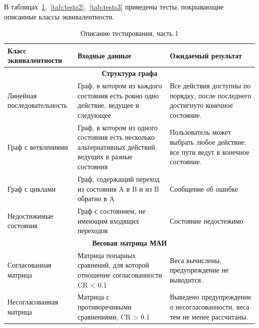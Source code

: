 В таблицах~\ref{tab:tests1},~\ref{tab:tests2},~\ref{tab:tests3} приведены тесты, покрывающие описанные классы эквивалентности.
\begin{table}[H]
\centering
\caption{Описание тестирования, часть 1}
\label{tab:tests1}
\begin{tabular}{|p{}|p{}|p{}|}
\hline
\textbf{Класс \newline эквивалентности} & \textbf{Входные данные} & \textbf{Ожидаемый \newline результат} \\
\hline
\multicolumn{3}{|c|}{\textbf{Структура графа}} \\
\hline
Линейная \newline последовательность & Граф, в котором из каждого состояния есть ровно одно действие, ведущее в следующее & Все действия доступны по порядку, после последнего достигнуто конечное состояние. \\
\hline
Граф \newline  с ветвлениями & Граф, в котором из одного состояния есть несколько альтернативных действий, ведущих в разные состояния & Пользователь может выбрать любое действие; все пути ведут в конечное состояние. \\
\hline
Граф с циклами & Граф, содержащий переход из состояния A в B и из B обратно в A & Сообщение об ошибке\\
\hline
Недостижимые \newline состояния & Граф с состоянием, не имеющим входящих переходов & Состояние недостежимо \\
\hline
\multicolumn{3}{|c|}{\textbf{Весовая матрица МАИ}} \\
\hline
Согласованная матрица & Матрица попарных сравнений, для которой отношение согласованности CR < 0.1 & Веса вычислены, предупреждение не выводится. \\
\hline
Несогласованная матрица & Матрица с противоречивыми сравнениями, CR > 0.1 & Выведено предупреждение о несогласованности, веса тем не менее рассчитаны. \\
\hline
\end{tabular}
\end{table}

